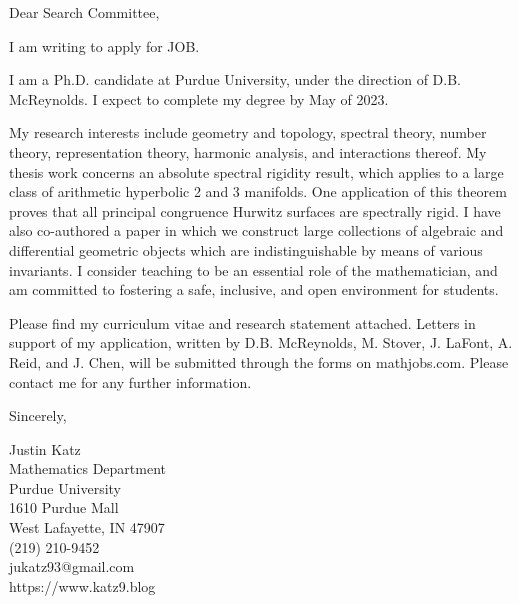 \documentclass[11pt, oneside]{letter}   	%
\begin{document}
\begin{letter}
\opening{Dear Search Committee,}
I am writing to apply for JOB. 


I am a Ph.D. candidate at Purdue University, under the direction of D.B. McReynolds. I expect to complete my degree by May of 2023.

My research interests include geometry and topology, spectral theory, number theory, representation theory, harmonic analysis, and interactions thereof. My thesis work concerns an absolute spectral rigidity result, which applies to a large class of arithmetic hyperbolic 2 and 3 manifolds.  One application of this theorem proves that all principal congruence Hurwitz surfaces are spectrally rigid. I have also co-authored a paper in which we construct large collections of algebraic and differential geometric objects which are indistinguishable by means of various invariants. I consider teaching to be an essential role of the mathematician, and am committed to fostering a safe, inclusive, and open environment for students. 

Please find my curriculum vitae and research statement attached. Letters in support of my application, written by D.B. McReynolds, M. Stover, J. LaFont, A. Reid, and J. Chen, will be submitted through the forms on mathjobs.com.  Please contact me for any further information. 

\closing{Sincerely,}
Justin Katz\\
Mathematics Department\\
Purdue University\\
1610 Purdue Mall\\
West Lafayette, IN 47907\\
(219) 210-9452 \\jukatz93@gmail.com\\
https://www.katz9.blog

\end{letter}
\end{document}
